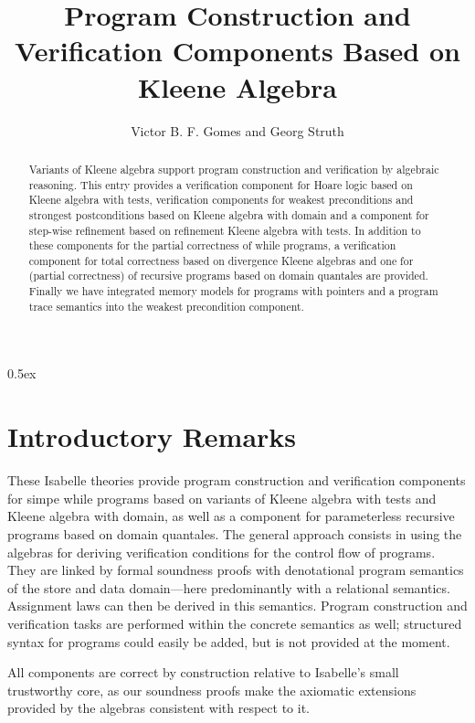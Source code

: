 \documentclass[11pt,a4paper]{article}
\begin{document}
\title{Program Construction and Verification Components Based on
  Kleene Algebra}
\author{Victor B. F. Gomes and Georg Struth}
\maketitle

\begin{abstract}
  Variants of Kleene algebra support program construction and
  verification by algebraic reasoning. This entry provides a
  verification component for Hoare logic based on Kleene algebra with
  tests, verification components for weakest preconditions and
  strongest postconditions based on Kleene algebra with domain and a
  component for step-wise refinement based on refinement Kleene
  algebra with tests. In addition to these components for the partial
  correctness of while programs, a verification component for total
  correctness based on divergence Kleene algebras and one for
  (partial correctness) of recursive programs based on domain
  quantales are provided. Finally we have integrated memory models for
  programs with pointers and a program trace semantics into the
  weakest precondition component.
\end{abstract}

\tableofcontents

\parindent 0pt\parskip 0.5ex

\section{Introductory Remarks}

These Isabelle theories provide program construction and verification
components for simpe while programs based on variants of Kleene
algebra with tests and Kleene algebra with domain, as well as a
component for parameterless recursive programs based on domain
quantales. The general approach consists in using the algebras for
deriving verification conditions for the control flow of
programs. They are linked by formal soundness proofs with denotational
program semantics of the store and data domain---here predominantly
with a relational semantics.  Assignment laws can then be derived in
this semantics. Program construction and verification tasks are
performed within the concrete semantics as well; structured syntax for
programs could easily be added, but is not provided at the moment.

All components are correct by construction relative to Isabelle's
small trustworthy core, as our soundness proofs make the axiomatic
extensions provided by the algebras consistent with respect to it.
\end{document}
